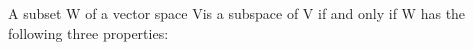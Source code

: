 \documentclass[preview]{standalone}
\begin{document}
\begin{center}
A subset W of a vector space Vis a subspace of V if and only if W has the following three properties:
\end{center}
\end{document}

